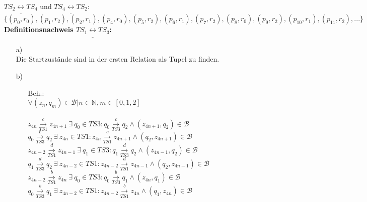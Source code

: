 \documentclass[a4paper,11pt,fleqn]{scrartcl}
\begin{document}
\begin{enumerate}
    	\(TS_2\underline{\leftrightarrow}TS_4\) und \(TS_4\underline{\leftrightarrow}TS_2:\) \\
	    \(
	    \big\{(p_0,r_0),(p_1,r_2),(p_2,r_1),(p_4,r_0),(p_5,r_2),(p_6,r_1),(p_7,r_2),(p_8,r_0),(p_9,r_2),
    		(p_{10},r_1),(p_{11},r_2),...\big\}
	    \) \\ \newpage
	    \textbf{Definitionsnachweis \(TS_1\underline{\leftrightarrow}TS_3\):}
	    \begin{enumerate}
	    	\item[a)]\quad \\
	    		Die Startzustände sind in der ersten Relation als Tupel zu finden.
	    	\item[b)]\quad \\
            \begin{enumerate}
				\item[Beh.:]\quad \\
                \(\forall (z_n,q_m)\in \mathcal{B} |n\in \mathbb{N}, m\in[0,1,2] \)\\ \\
					\(z_{4n}\overset{c}{\underset{TS1}{\rightarrow}}z_{4n+1}\ \exists\ q_0 \in 
					TS3:q_0\overset{c}{\underset{TS3}{\rightarrow}}q_2 \land (z_{4n+1},q_2)\in \mathcal{B}\) \\
					
					\(q_0\overset{c}{\underset{TS3}{\rightarrow}}q_2\ \exists\ z_{4n} \in 
					TS1:z_{4n}\overset{c}{\underset{TS1}{\rightarrow}}z_{4n+1} \land (q_2,z_{4n+1})\in
					\mathcal{B}\) \\
					
					\(z_{4n-2}\overset{d}{\underset{TS1}{\rightarrow}}z_{4n-1}\ \exists\ q_1 \in 
					TS3:q_1\overset{d}{\underset{TS3}{\rightarrow}}q_2 \land (z_{4n-1},q_2)\in \mathcal{B}\) \\
					
					\(q_1\overset{d}{\underset{TS3}{\rightarrow}}q_2\ \exists\ z_{4n-2} \in 
					TS1:z_{4n-2}\overset{d}{\underset{TS1}{\rightarrow}}z_{4n-1} \land (q_2,z_{4n-1})\in
					\mathcal{B}\) \\
					
					\(z_{4n-2}\overset{b}{\underset{TS1}{\rightarrow}}z_{4n}\ \exists\ q_0 \in 
					TS3:q_0\overset{b}{\underset{TS3}{\rightarrow}}q_1 \land (z_{4n},q_1)\in \mathcal{B}\) \\
					
					\(q_0\overset{b}{\underset{TS3}{\rightarrow}}q_1\ \exists\ z_{4n-2} \in 
					TS1:z_{4n-2}\overset{b}{\underset{TS1}{\rightarrow}}z_{4n} \land (q_1,z_{4n})\in
					\mathcal{B}\) \\
					

\end{enumerate}
\end{enumerate}
\end{enumerate}
\end{document}
